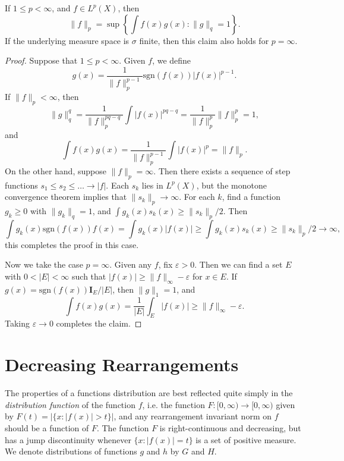 \begin{theorem}
    If $1 \leq p < \infty$, and $f \in L^p(X)$, then
    \[ \| f \|_p = \sup \left\{ \int f(x)g(x) : \| g \|_q = 1 \right\}. \]
    If the underlying measure space is $\sigma$ finite, then this claim also holds for $p = \infty$.
\end{theorem}
\begin{proof}
    Suppose that $1 \leq p < \infty$. Given $f$, we define
    \[ g(x) = \frac{1}{\| f \|_p^{p-1}} \text{sgn}(f(x)) |f(x)|^{p-1}. \]
    If $\| f \|_p < \infty$, then
    \[ \| g \|_q^q = \frac{1}{\| f \|_p^{pq - q}} \int |f(x)|^{pq-q} = \frac{1}{\| f \|_p^p} \| f \|_p^p = 1, \]
    and
    \[ \int f(x) g(x) = \frac{1}{\| f \|_p^{p-1}} \int |f(x)|^p = \| f \|_p. \]
    On the other hand, suppose $\| f \|_p = \infty$. Then there exists a sequence of step functions $s_1 \leq s_2 \leq \dots \to |f|$. Each $s_k$ lies in $L^p(X)$, but the monotone convergence theorem implies that $\| s_k \|_p \to \infty$. For each $k$, find a function $g_k \geq 0$ with $\| g_k \|_q = 1$, and $\int g_k(x) s_k(x) \geq \| s_k \|_p / 2$. Then
    \[ \int g_k(x) \text{sgn}(f(x)) f(x) = \int g_k(x) |f(x)| \geq \int g_k(x) s_k(x) \geq \| s_k \|_p / 2 \to \infty, \]
    this completes the proof in this case. 

    Now we take the case $p = \infty$. Given any $f$, fix $\varepsilon > 0$. Then we can find a set $E$ with $0 < |E| < \infty$ such that $|f(x)| \geq \| f \|_\infty - \varepsilon$ for $x \in E$. If $g(x) = \text{sgn}(f(x)) \mathbf{I}_E / |E|$, then $\| g \|_1 = 1$, and
    \[ \int f(x) g(x) = \frac{1}{|E|} \int_E |f(x)| \geq \| f \|_\infty - \varepsilon. \]
    Taking $\varepsilon \to 0$ completes the claim.
\end{proof}

\section{Decreasing Rearrangements}

 The properties of a functions distribution are best reflected quite simply in the \emph{distribution function} of the function $f$, i.e. the function $F: [0,\infty) \to [0,\infty)$ given by $F(t) = |\{ x : |f(x)| > t \}|$, and any rearrangement invariant norm on $f$ should be a function of $F$. The function $F$ is right-continuous and decreasing, but has a jump discontinuity whenever $\{ x : |f(x)| = t \}$ is a set of positive measure. We denote distributions of functions $g$ and $h$ by $G$ and $H$.

